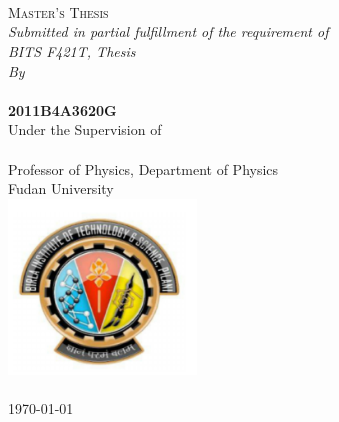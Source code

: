 \documentclass[11pt, oneside]{Thesis} %
\theoremstyle{plain}
\theoremstyle{definition}
\begin{document}
\begin{titlepage}
\begin{center}
\HRule \\[0.4cm] %
{\huge \bfseries \ttitle}\\[0.4cm] %
\HRule \\[1.5cm] %
\textsc{\Large Master's Thesis}\\[0.5cm] %

\large \textit{Submitted in partial fulfillment of the requirement of \\ BITS F421T, Thesis}\\[0.3cm]%
\textit{By}\\[0.4cm]
\textbf{\authornames} \\
\textbf{2011B4A3620G} \\
\vspace*{\baselineskip}
Under the Supervision of \\[0.2cm]
\textbf{\supname} \\
Professor of Physics, Department of Physics \\
Fudan University \\ [1cm]
\includegraphics[width=50mm]{BITS_logo.pdf} \\[1cm] %
\textsc{\LARGE \univname}\\[1.5cm] %
{\large \today}\\[4cm] %

 
\vfill
\end{center}

\end{titlepage}

\end{document}
